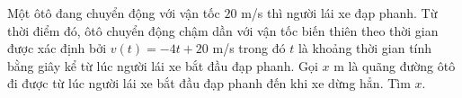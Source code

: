 \begin{bt}%

	Một ôtô đang chuyển động với vận tốc $20$ m/s thì người lái xe đạp phanh. Từ thời điểm đó, ôtô chuyển động chậm dần với vận tốc biến thiên theo thời gian được xác định bởi $v(t)=-4t+20$ m/s trong đó $t$ là khoảng thời gian tính bằng giây kể từ lúc người lái xe bắt đầu đạp phanh. Gọi $x$ m là quãng đường ôtô đi được từ lúc người lái xe bắt đầu đạp phanh đến khi xe dừng hẳn. Tìm $x$.
	
\end{bt}

